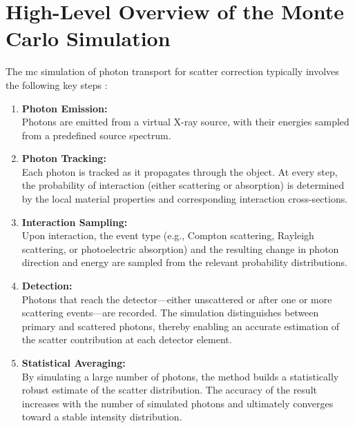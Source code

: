 \section{High-Level Overview of the Monte Carlo Simulation}

The \ac{mc} simulation of photon transport for scatter correction typically involves the following key steps \cite{mcffd2011}:

\begin{enumerate}
    \item \textbf{Photon Emission:} \\
        Photons are emitted from a virtual X-ray source, with their energies sampled
        from a predefined source spectrum.
        
    \item \textbf{Photon Tracking:} \\
        Each photon is tracked as it propagates through the object. At every
        step, the probability of interaction (either scattering or absorption)
        is determined by the local material properties and corresponding
        interaction cross-sections.
        
    \item \textbf{Interaction Sampling:} \\
        Upon interaction, the event type (e.g., Compton scattering, Rayleigh
        scattering, or photoelectric absorption) and the resulting change in
        photon direction and energy are sampled from the relevant probability
        distributions.
        
    \item \textbf{Detection:} \\
        Photons that reach the detector—either unscattered or after one or more
        scattering events—are recorded. The simulation distinguishes between
        primary and scattered photons, thereby enabling an accurate estimation
        of the scatter contribution at each detector element.
        
    \item \textbf{Statistical Averaging:} \\
        By simulating a large number of photons, the method builds a
        statistically robust estimate of the scatter distribution. The accuracy
        of the result increases with the number of simulated photons and
        ultimately converges toward a stable intensity distribution.
\end{enumerate}

